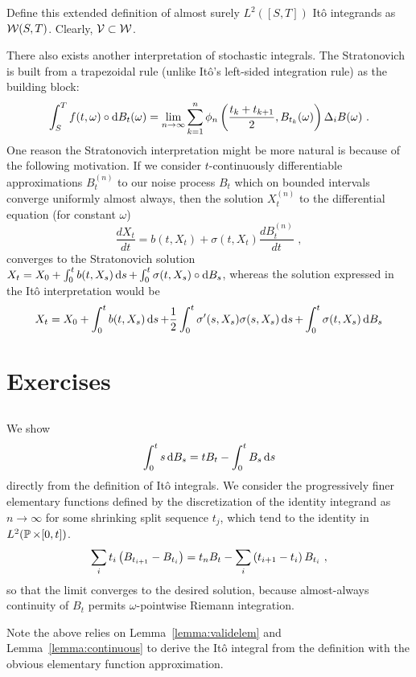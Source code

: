 \documentclass{article}
\begin{document}
Define this extended definition of almost surely \(L^2([S,T])\) It\^{o} integrands as \(\mcW(S,T)\). Clearly, \(\mcV\subset\mcW\).

There also exists another interpretation of stochastic integrals. The Stratonovich is built from a trapezoidal rule (unlike It\^{o}'s left-sided integration rule) as the building block:
  \[
\int_S^Tf(t, \omega)\circ \d{B_t(\omega)}=\lim_{n\rightarrow\infty}\sum_{k=1}^n\phi_n\pa{\frac{t_k+t_{k+1}}{2}, B_{t_k}(\omega)}\Delta_i B(\omega)\,\,.
\]
One reason the Stratonovich interpretation might be more natural is because of the following motivation. If we consider \(t\)-continuously differentiable approximations \(B_t^{(n)}\) to our noise process \(B_t\) which on bounded intervals converge uniformly almost always, then the solution \(X^{(n)}_t\) to the differential equation (for constant \(\omega\))
\[
\frac{d X_t}{dt}=b(t,X_t)+\sigma(t,X_t)\frac{dB_t^{(n)}}{dt}\,\,,
\]
converges to the Stratonovich solution \(X_t=X_0+\int_0^tb(t, X_s)\d{s}+\int_0^t\sigma(t, X_s)\circ\d{B_s}\), whereas the solution expressed in the It\^{o} interpretation would be
\[
  X_t=X_0+\int_0^tb(t, X_s)\d{s}+\frac{1}{2}\int_0^{t}\sigma'(s, X_s)\sigma(s, X_s)\d{s}+\int_0^t\sigma(t, X_s)\d{B_s}
  \]

\section{Exercises}

\subsection{}
\label{pt1}
We show
\[
  \int_0^t s\d{B_s}=tB_t-\int_0^tB_s\d{s}
\]
directly from the definition of It\^{o} integrals. We consider the progressively finer elementary functions defined by the discretization of the identity integrand as \(n\rightarrow\infty\) for some shrinking split sequence \(t_j\), which tend to the identity in \(L^2(\P\times[0,t])\).
\[
  \sum_it_i\pa{B_{t_{i+1}}-B_{t_{i}}}=  t_nB_t-\sum_i\pa{t_{i+1}-t_{i}}B_{t_i}\,\,,
\]
so that the limit converges to the desired solution, because almost-always continuity of \(B_t\) permits \(\omega\)-pointwise Riemann integration.

Note the above relies on Lemma~\ref{lemma:validelem} and Lemma~\ref{lemma:continuous} to derive the It\^{o} integral from the definition with the obvious elementary function approximation.

\subsection{}
\label{pt2}
\end{document}
